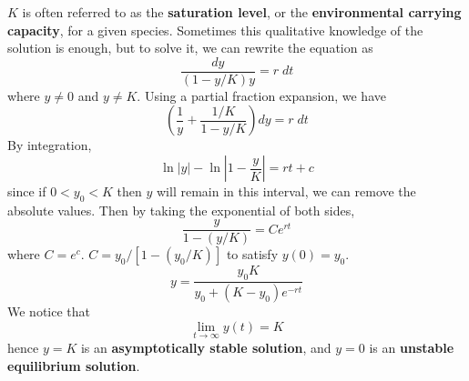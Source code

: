     $K$ is often referred to as the \textbf{saturation level}, or the \textbf{environmental carrying capacity}, for a given species.
    \newline \indent
    Sometimes this qualitative knowledge of the solution is enough, but to solve it, we can rewrite the equation as
    \begin{equation*}
        \frac{dy}{(1 - y/K)y} = r \; dt
    \end{equation*}
    where $y \neq 0$ and $y \neq K$. Using a partial fraction expansion, we have
    \begin{equation*}
        (\frac{1}{y} + \frac{1/K}{1-y/K})dy = r \; dt
    \end{equation*}
    By integration,
    \begin{equation*}
        \ln |y| - \ln |1 - \frac{y}{K}| = rt + c
    \end{equation*}
    since if $0 < y_0 < K$ then $y$ will remain in this interval, we can remove the absolute values. Then by taking the exponential of both sides,
    \begin{equation*}
        \frac{y}{1-(y/K)} = Ce^{rt}
    \end{equation*}
    where $C = e^c$. $C = y_0/[1-(y_0/K)]$ to satisfy $y(0) = y_0$.
    \begin{equation*}
        y = \frac{y_0K}{y_0 + (K - y_0)e^{-rt}}
    \end{equation*}
    We notice that 
    \begin{equation*}
        \lim_{t \rightarrow \infty} y(t) = K
    \end{equation*}
    hence $y = K$ is an \textbf{asymptotically stable solution}, and $y = 0$ is an \textbf{unstable equilibrium solution}.
    
    